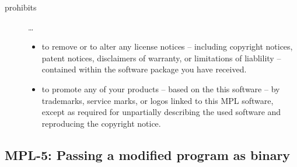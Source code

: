 \begin{description}
\begin{itemize}
 \end{itemize}
 
\item[prohibits] \ldots
\begin{itemize}
  \item to remove or to alter any license notices -- including copyright
  notices, patent notices, disclaimers of warranty, or limitations of liablility
  -- contained within the software package you have received.
  \item to promote any of your products -- based on the this software -- by
  trademarks, service marks, or logos linked to this MPL software, except as
  required for unpartially describing the used software and reproducing the
  copyright notice.
\end{itemize}

\end{description}

\subsection{MPL-5: Passing a modified program as binary}

